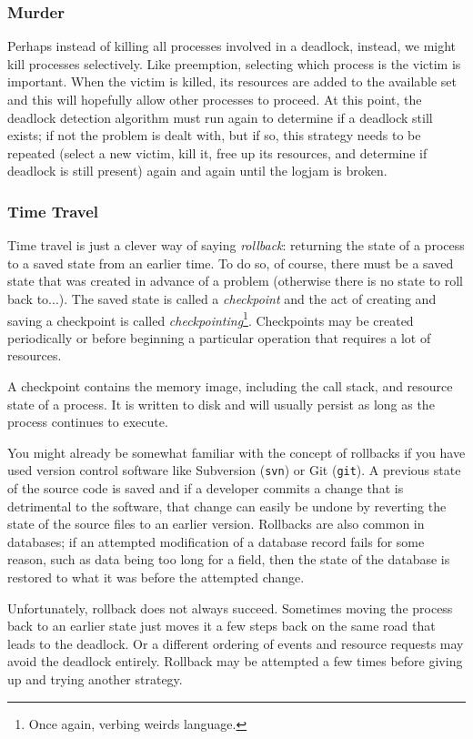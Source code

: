 \subsubsection*{Murder}
Perhaps instead of killing all processes involved in a deadlock, instead, we might kill processes selectively. Like preemption, selecting which process is the victim is important. When the victim is killed, its resources are added to the available set and this will hopefully allow other processes to proceed. At this point, the deadlock detection algorithm must run again to determine if a deadlock still exists; if not the problem is dealt with, but if so, this strategy needs to be repeated (select a new victim, kill it, free up its resources, and determine if deadlock is still present) again and again until the logjam is broken.



\subsubsection*{Time Travel}
Time travel is just a clever way of saying \textit{rollback}: returning the state of a process to a saved state from an earlier time. To do so, of course, there must be a saved state that was created in advance of a problem (otherwise there is no state to roll back to...). The saved state is called a \textit{checkpoint} and the act of creating and saving a checkpoint is called \textit{checkpointing}\footnote{Once again, verbing weirds language.}. Checkpoints may be created periodically or before beginning a particular operation that requires a lot of resources.

A checkpoint contains the memory image, including the call stack, and resource state of a process. It is written to disk and will usually persist as long as the process continues to execute.

You might already be somewhat familiar with the concept of rollbacks if you have used version control software like Subversion (\texttt{svn}) or Git (\texttt{git}). A previous state of the source code is saved and if a developer commits a change that is detrimental  to the software, that change can easily be undone by reverting the state of the source files to an earlier version. Rollbacks are also common in databases; if an attempted modification of a database record fails for some reason, such as data being too long for a field, then the state of the database is restored to what it was before the attempted change.

Unfortunately, rollback does not always succeed. Sometimes moving the process back to an earlier state just moves it a few steps back on the same road that leads to the deadlock.  Or a different ordering of events and resource requests may avoid the deadlock entirely. Rollback may be attempted a few times before giving up and trying another strategy.



